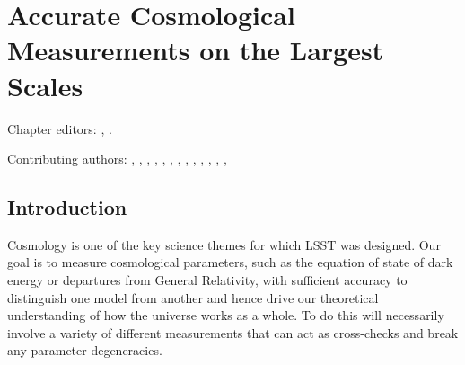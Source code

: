 
\chapter[Cosmology]{Accurate Cosmological Measurements on the Largest Scales}
\def\chpname{cosmo}\label{chp:\chpname}

Chapter editors:
,
.

Contributing authors:
,
,
,
,
,
,
,
,
,
,
,
,
,

%


\section{Introduction}
\label{sec:\chpname:intro}

Cosmology is one of the key science themes for which LSST was
designed. Our goal is to measure cosmological parameters, such as the
equation of state of dark energy or departures from General
Relativity, with sufficient accuracy to distinguish one model from
another and hence drive our theoretical understanding of how the
universe works as a whole. To do this will necessarily involve a
variety of different measurements that can act as cross-checks and break
any parameter degeneracies.

